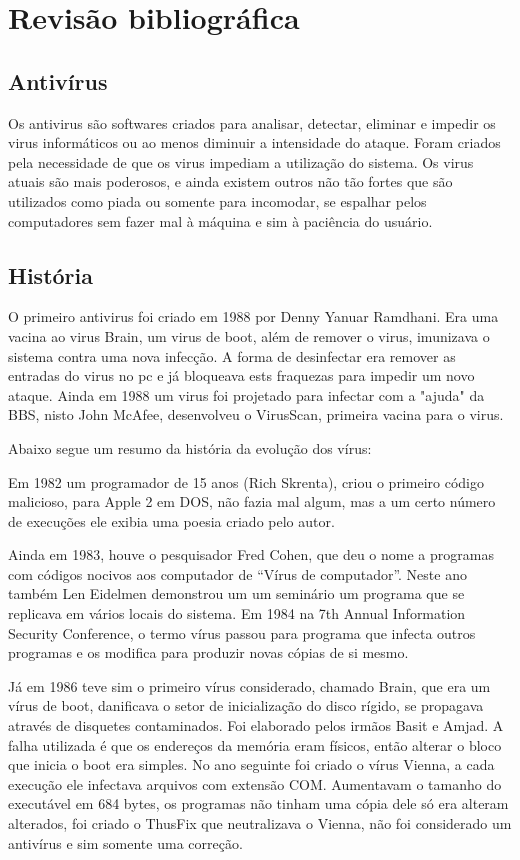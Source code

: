 
\chapter{Revisão bibliográfica}


\section{Antivírus}
Os antivirus \cite{Szor} são softwares criados para analisar, detectar, eliminar e impedir os virus informáticos ou ao menos diminuir a intensidade do ataque. Foram criados pela necessidade de que os virus impediam a utilização do sistema. Os virus atuais são mais poderosos, e ainda existem outros não tão fortes que são utilizados como piada ou somente para incomodar, se espalhar pelos computadores sem fazer mal à máquina e sim à paciência do usuário.

\section{História}
O primeiro antivirus foi criado em 1988 por Denny Yanuar Ramdhani. Era uma vacina ao virus Brain, um virus de boot, além de remover o virus, imunizava o sistema contra uma nova infecção. A forma de desinfectar era remover as entradas do virus no pc e já bloqueava ests fraquezas para impedir um novo ataque. Ainda em 1988 um virus foi projetado para infectar com a "ajuda" da BBS, nisto John McAfee, desenvolveu o VirusScan, primeira vacina para o virus.

	Abaixo segue um resumo da história da evolução dos vírus:
	
	Em 1982 um programador de 15 anos (Rich Skrenta), criou o primeiro código malicioso, para Apple 2 em DOS, não fazia mal algum, mas a um certo número de execuções ele exibia uma poesia criado pelo autor.
	
	
	Ainda em 1983, houve o pesquisador Fred Cohen, que deu o nome a programas com códigos nocivos aos computador de “Vírus de computador”. Neste ano também Len Eidelmen demonstrou um um seminário um programa que se replicava em vários locais do sistema. Em 1984 na 7th Annual Information Security Conference, o termo vírus passou para programa que infecta outros programas e os modifica para produzir novas cópias de si mesmo. 
	
	
	Já em 1986 teve sim o primeiro vírus considerado, chamado Brain, que era um vírus de boot, danificava o setor de inicialização do disco rígido, se propagava através de disquetes contaminados. Foi elaborado pelos irmãos Basit e Amjad. A falha utilizada é que os endereços da memória eram físicos, então alterar o bloco que inicia o boot era simples. No ano seguinte foi criado o vírus Vienna, a cada execução ele infectava arquivos com extensão COM. Aumentavam o tamanho do executável em 684 bytes, os programas não tinham uma cópia dele só era alteram alterados, foi criado o ThusFix que neutralizava o Vienna, não foi considerado um antivírus e sim somente uma correção.


